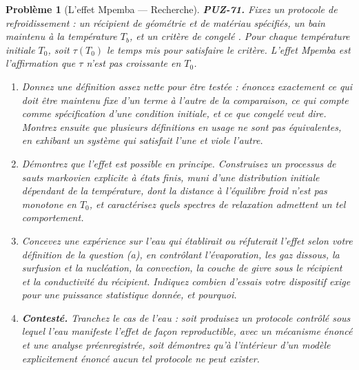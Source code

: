 \documentclass[11pt]{article}
\newtheorem{problem}{Problème}
\begin{document}
\begin{problem}[{L'effet Mpemba --- Recherche}]
\textbf{PUZ-71.} Fixez un protocole de refroidissement : un récipient de géométrie et de
matériau spécifiés, un bain maintenu à la température $ T_b $, et un critère de
\og{} congelé \fg{}. Pour chaque température initiale $ T_0 $, soit $ \tau(T_0) $ le temps mis
pour satisfaire le critère. L'effet Mpemba est l'affirmation que $ \tau $ n'est pas
croissante en $ T_0 $.
\begin{enumerate}
\item[(a)] Donnez une définition assez nette pour être testée : énoncez exactement ce qui doit être
maintenu fixe d'un terme à l'autre de la comparaison, ce qui compte comme spécification d'une
condition initiale, et ce que \og{} congelé \fg{} veut dire. Montrez ensuite que plusieurs
définitions en usage ne sont pas équivalentes, en exhibant un système qui satisfait l'une et
viole l'autre.
\item[(b)] Démontrez que l'effet est possible en principe. Construisez un processus de sauts
markovien explicite à états finis, muni d'une distribution initiale dépendant de la
température, dont la distance à l'équilibre froid n'est pas monotone en $ T_0 $, et
caractérisez quels spectres de relaxation admettent un tel comportement.
\item[(c)] Concevez une expérience sur l'eau qui établirait ou réfuterait l'effet selon votre
définition de la question (a), en contrôlant l'évaporation, les gaz dissous, la surfusion et
la nucléation, la convection, la couche de givre sous le récipient et la conductivité du
récipient. Indiquez combien d'essais votre dispositif exige pour une puissance statistique
donnée, et pourquoi.
\item[(d)] \textbf{Contesté.} Tranchez le cas de l'eau : soit produisez un protocole contrôlé sous
lequel l'eau manifeste l'effet de façon reproductible, avec un mécanisme énoncé et une analyse
préenregistrée, soit démontrez qu'à l'intérieur d'un modèle explicitement énoncé aucun tel
protocole ne peut exister.
\end{enumerate}

\end{problem}
\end{document}
